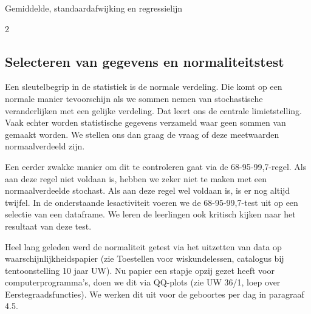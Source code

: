 \begin{lesactiviteit}{Gemiddelde, standaardafwijking en regressielijn}
\begin{vraagenantwoord}[resume]
    
    \end{vraagenantwoord}

\end{lesactiviteit}
\begin{multicols}{2}


\subsection{Selecteren van gegevens en normaliteitstest}
Een sleutelbegrip in de statistiek is de normale verdeling. Die komt op een normale manier tevoorschijn als we sommen nemen van stochastische veranderlijken met een gelijke verdeling. Dat leert ons de centrale limietstelling. Vaak echter worden statistische gegevens verzameld waar geen sommen van gemaakt worden. We stellen ons dan graag de vraag of deze meetwaarden normaalverdeeld zijn. 

Een eerder zwakke manier om dit te controleren gaat via de 68-95-99,7-regel. Als aan deze regel niet voldaan is, hebben we zeker niet te maken met een normaalverdeelde stochast. Als aan deze regel wel voldaan is, is er nog altijd twijfel. In de onderstaande lesactiviteit voeren we de 68-95-99,7-test uit op een selectie van een dataframe. We leren de leerlingen ook kritisch kijken naar het resultaat van deze test.

Heel lang geleden werd de normaliteit getest via het uitzetten van data op waarschijnlijkheidspapier (zie Toestellen voor wiskundelessen, catalogus bij tentoonstelling 10 jaar UW). Nu papier een stapje opzij gezet heeft voor computerprogramma's, doen we dit via QQ-plots (zie UW 36/1, loep over Eerstegraadsfuncties). We werken dit uit voor de geboortes per dag in paragraaf 4.5.

\end{multicols}
